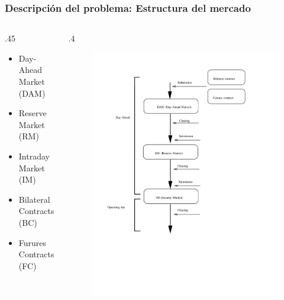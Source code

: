 \documentclass[xcolor=dvipsnames, utf8, spanish]{beamer} %
\begin{document}
\begin{frame}
	\frametitle{Descripción del problema: Estructura del mercado}
	\begin{columns}
		\begin{column} {.45\textwidth}
			\begin{itemize}
				\item Day-Ahead Market (DAM)
				\item Reserve Market (RM)
				\item Intraday Market (IM)
			\end{itemize}
			\bigskip
			\begin{itemize}
				\item Bilateral Contracts (BC)
				\item Furures Contracts (FC)
			\end{itemize}
		\end{column}

		\begin{column} {.4\textwidth}
			\begin{figure}
			
\includegraphics[width=1.2\linewidth]{figuras/esquemaMercados.JPG}
		\end{figure}
		\end{column}
	\end{columns}
\end{frame}
\end{document}
